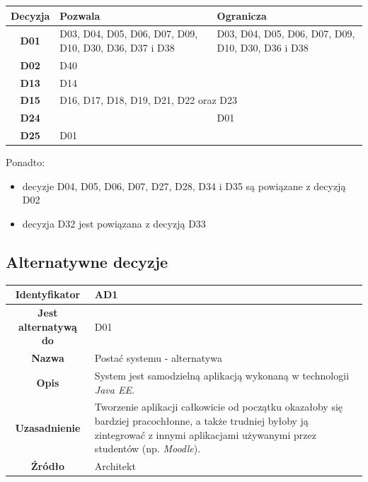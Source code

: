 %
\begin{table}[H]
\centering
\begin{tabular}{ | >{\bfseries}c | p{5.5cm} | p{5.5cm} | }
\hline
Decyzja & \textbf{Pozwala} & \textbf{Ogranicza} \\ \hline
%
D01 & D03, D04, D05, D06, D07, D09, D10, D30, D36, D37 i D38 & D03, D04, D05, D06, D07, D09, D10, D30, D36 i D38 \\ \hline
D02 & D40 & \\ \hline
D13 & \multicolumn{2}{|l|}{D14} \\ \hline
D15 & \multicolumn{2}{|l|}{D16, D17, D18, D19, D21, D22 oraz D23} \\ \hline
D24 & & D01 \\ \hline
D25 & \multicolumn{2}{|l|}{D01} \\ \hline
%
\end{tabular}
\end{table}
Ponadto:
\begin{itemize}
\item{decyzje D04, D05, D06, D07, D27, D28, D34 i D35 są powiązane z decyzją D02}
\item{decyzja D32 jest powiązana z decyzją D33}
\end{itemize}

\subsection{Alternatywne decyzje}
\label{Chapter554}

\begin{table}[H]
\centering
\begin{tabular}{ | >{\bfseries}c | p{11cm} | }
\hline
%
Identyfikator & AD1 \\ \hline
Jest alternatywą do & D01 \\ \hline
Nazwa & Postać systemu - alternatywa \\ \hline
Opis & System jest samodzielną aplikacją wykonaną w technologii \textit{Java EE}. \\ \hline
Uzasadnienie & Tworzenie aplikacji całkowicie od początku okazałoby się bardziej pracochłonne, a także trudniej byłoby ją zintegrować z innymi aplikacjami używanymi przez studentów (np. \textit{Moodle}). \\ \hline
Źródło & Architekt \\ \hline
%
\end{tabular}
\end{table}

